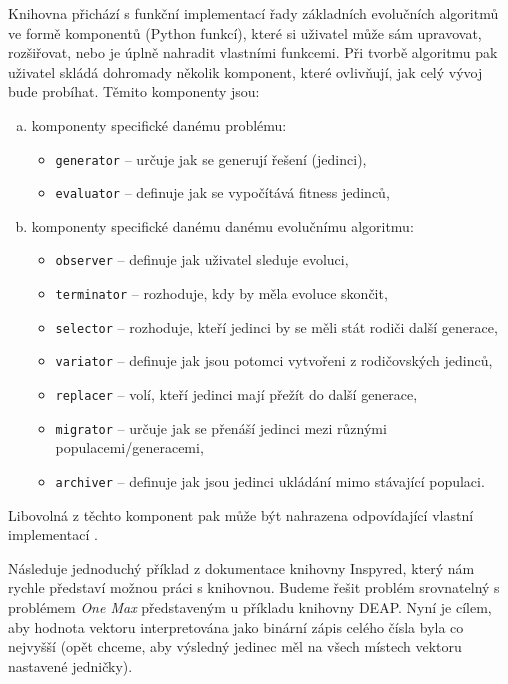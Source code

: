 Knihovna přichází s funkční implementací řady základních 
evolučních algoritmů ve formě komponentů (Python funkcí), které si uživatel
může sám upravovat, rozšiřovat, nebo je úplně nahradit vlastními funkcemi. Při
tvorbě algoritmu pak uživatel skládá dohromady několik komponent, které
ovlivňují, jak celý vývoj bude probíhat.
Těmito komponenty jsou:
\begin{enumerate}[a)]
    \item komponenty specifické danému problému:
        \begin{itemize}
            \item \texttt{generator} -- určuje jak se generují řešení
                (jedinci),
            \item \texttt{evaluator} -- definuje jak se vypočítává fitness
                jedinců,
        \end{itemize}
    \item komponenty specifické danému danému evolučnímu algoritmu:
        \begin{itemize}
            \item \texttt{observer} -- definuje jak uživatel sleduje evoluci,
            \item \texttt{terminator} -- rozhoduje, kdy by měla evoluce
                skončit,
            \item \texttt{selector} -- rozhoduje, kteří jedinci by se měli stát
                rodiči další generace,
            \item \texttt{variator} -- definuje jak jsou potomci vytvořeni z
                rodičovských jedinců,
            \item \texttt{replacer} -- volí, kteří jedinci mají přežít do další
                generace,
            \item \texttt{migrator} -- určuje jak se přenáší jedinci mezi
                různými \\populacemi/generacemi,
            \item \texttt{archiver} -- definuje jak jsou jedinci ukládání mimo
                stávající populaci.
        \end{itemize}
\end{enumerate}

Libovolná z těchto komponent pak může být nahrazena odpovídající vlastní
implementací \citep{tonda2020inspyred}.

Následuje jednoduchý příklad z dokumentace knihovny Inspyred, který nám rychle
představí možnou práci s knihovnou. Budeme řešit problém srovnatelný s
problémem \emph{One Max} představeným u příkladu knihovny DEAP. Nyní je cílem,
aby hodnota vektoru interpretována jako binární zápis celého čísla byla co
nejvyšší (opět chceme, aby výsledný jedinec měl na všech místech vektoru
nastavené jedničky). 

